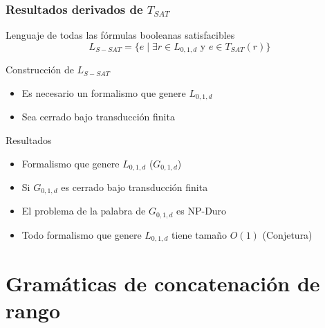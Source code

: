 \documentclass{beamer}
\begin{document}
\begin{frame}
\begin{figure}[h]
{\begin{otherlanguage}{english}
            \end{otherlanguage}}
    \end{figure}
\end{frame}

\begin{frame}
    \frametitle{Resultados derivados de $T_{SAT}$}
    
    \begin{block}{Lenguaje de todas las fórmulas booleanas satisfacibles}
        $$L_{S-SAT}=\{e\mid \exists r\in L_{0,1,d} \text{ y } e\in T_{SAT}(r)\}$$
    \end{block}
    \pause
    \begin{block}{Construcción de $L_{S-SAT}$}
        \begin{itemize}
            \item Es necesario un formalismo que genere $L_{0,1,d}$
                  \pause
            \item Sea cerrado bajo transducción finita
        \end{itemize}
    \end{block}
    \pause
    \begin{block}{Resultados}
        \begin{itemize}
            \item Formalismo que genere $L_{0,1,d}$ ($G_{0,1,d}$)
                  \pause
            \item Si $G_{0,1,d}$ es cerrado bajo transducción finita
                  \pause
            \item El problema de la palabra de $G_{0,1,d}$ es NP-Duro
                  \pause
            \item Todo formalismo que genere $L_{0,1,d}$ tiene tamaño $O(1)$ (Conjetura)
                  
        \end{itemize}
    \end{block}
\end{frame}

\section{Gramáticas de concatenación de rango}
\end{document}
